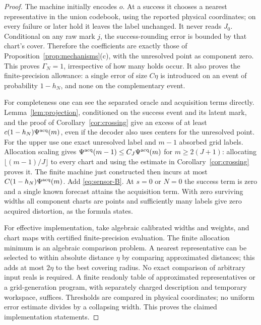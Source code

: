 \begin{proof}
The machine initially encodes $o$. At a success it chooses a nearest representative in the union codebook, using the reported physical coordinates; on every failure or later hold it leaves the label unchanged. It never reads $J_0$. Conditional on any raw mark $j$, the success-rounding error is bounded by that chart's cover. Therefore the coefficients are exactly those of Proposition~\ref{prop:mechanisms}(c), with the unresolved point as component zero. This proves $\Gamma_N=1$, irrespective of how many holds occur. It also proves the finite-precision allowance: a single error of size $C\eta$ is introduced on an event of probability $1-h_N$, and none on the complementary event.

For completeness one can see the separated oracle and acquisition terms directly. Lemma~\ref{lem:projection}, conditioned on the success event and its latent mark, and the proof of Corollary~\ref{cor:crossing} give an excess of at least $c(1-h_N)\Psi^{\rm acq}(m)$, even if the decoder also uses centers for the unresolved point. For the upper use one exact unresolved label and $m-1$ absorbed grid labels. Allocation scaling gives
$\Psi^{\rm acq}(m-1)\le C_J\Psi^{\rm acq}(m)$ for $m\ge2(J+1)$: allocating $\lfloor(m-1)/J\rfloor$ to every chart and using the estimate in Corollary~\ref{cor:crossing} proves it. The finite machine just constructed then incurs at most $C(1-h_N)\Psi^{\rm acq}(m)$. Add \eqref{eq:sensor-B}. At $s=0$ or $N=0$ the success term is zero and a single known forecast attains the acquisition term. With zero surviving widths all component charts are points and sufficiently many labels give zero acquired distortion, as the formula states.

For effective implementation, take algebraic calibrated widths and weights, and chart maps with certified finite-precision evaluation. The finite allocation minimum is an algebraic comparison problem. A nearest representative can be selected to within absolute distance $\eta$ by comparing approximated distances; this adds at most $2\eta$ to the best covering radius. No exact comparison of arbitrary input reals is required. A finite readonly table of approximated representatives or a grid-generation program, with separately charged description and temporary workspace, suffices. Thresholds are compared in physical coordinates; no uniform error estimate divides by a collapsing width. This proves the claimed implementation statements.
\end{proof}


